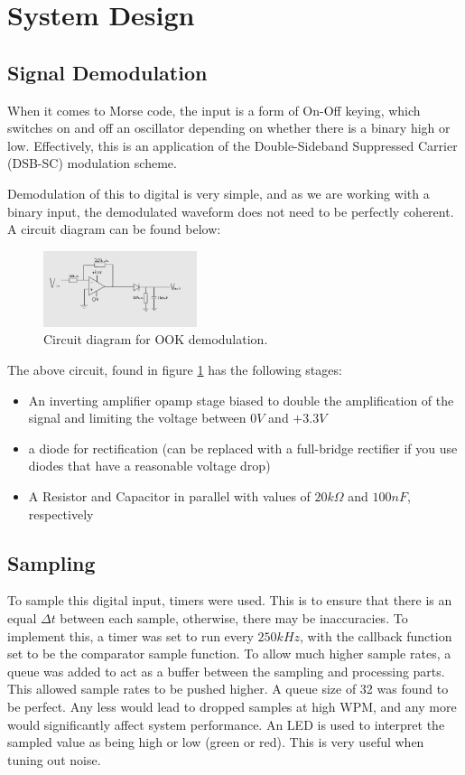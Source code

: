 \documentclass[head=13.6pt]{cce2014-design}
\begin{document}
\section{System Design}
\subsection{Signal Demodulation}
When it comes to Morse code, the input is a form of On-Off keying, which switches on and off an oscillator depending on whether there is a binary high or low. Effectively, this is an application of the Double-Sideband Suppressed Carrier (DSB-SC) modulation scheme.

Demodulation of this to digital is very simple, and as we are working with a binary input, the demodulated waveform does not need to be perfectly coherent. A circuit diagram can be found below:

\begin{figure}[tb]
    \centering
    \includegraphics[width=0.4\textwidth]{images/circuit.png}
    \caption{Circuit diagram for OOK demodulation.}
    \label{whateverthehecktherefis}
\end{figure}

The above circuit, found in figure \ref{whateverthehecktherefis} has the following stages:
\begin{itemize}
\item An inverting amplifier opamp stage biased to double the amplification of the signal and limiting the voltage between $0V$ and $+3.3V$
\item a diode for rectification (can be replaced with a full-bridge rectifier if you use diodes that have a reasonable voltage drop)
\item A Resistor and Capacitor in parallel with values of $20k\Omega$ and $100nF$, respectively
\end{itemize}

\subsection{Sampling}
To sample this digital input, timers were used. This is to ensure that there is an equal $\Delta t$ between each sample, otherwise, there may be inaccuracies. To implement this, a timer \cite{umcode} was set to run every $250kHz$, with the callback function set to be the comparator sample function. To allow much higher sample rates, a queue was added to act as a buffer between the sampling and processing parts. This allowed sample rates to be pushed higher. A queue size of 32 was found to be perfect. Any less would lead to dropped samples at high WPM, and any more would significantly affect system performance. An LED is used to interpret the sampled value as being high or low (green or red). This is very useful when tuning out noise.
\end{document}
